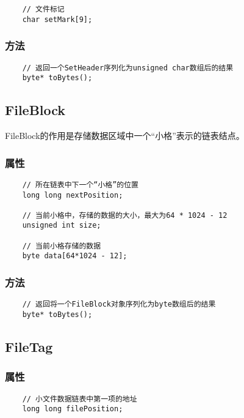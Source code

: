 \documentclass[11pt, a4paper]{book}
\begin{document}
\begin{CJK*}{UTF8}{gbsn}
\begin{lstlisting}
    // 文件标记
    char setMark[9];
  \end{lstlisting}

  \subsubsection{方法}

  \begin{lstlisting}
    // 返回一个SetHeader序列化为unsigned char数组后的结果
    byte* toBytes();
  \end{lstlisting}

  \subsection{FileBlock}

  FileBlock的作用是存储数据区域中一个“小格”表示的链表结点。

  \subsubsection{属性}

  \begin{lstlisting}
    // 所在链表中下一个“小格”的位置
    long long nextPosition;

    // 当前小格中，存储的数据的大小，最大为64 * 1024 - 12
    unsigned int size;

    // 当前小格存储的数据
    byte data[64*1024 - 12];
  \end{lstlisting}

  \subsubsection{方法}

  \begin{lstlisting}
    // 返回将一个FileBlock对象序列化为byte数组后的结果
    byte* toBytes();
  \end{lstlisting}

  \subsection{FileTag}

  \subsubsection{属性}
  
  \begin{lstlisting}
    // 小文件数据链表中第一项的地址
    long long filePosition;


\end{lstlisting}
\end{CJK*}
\end{document}
